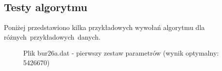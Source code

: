 \documentclass[12pt]{article}
\begin{document}
\subsection{Testy algorytmu}
Poniżej przedstawiono kilka przykładowych wywołań algorytmu dla różnych~przykładowych~danych.

\begin{figure}
\caption[Podpis_do_spisu]{Plik bur26a.dat - pierwszy zestaw parametrów (wynik optymalny: 5426670)}
\end{figure}
\end{document}
